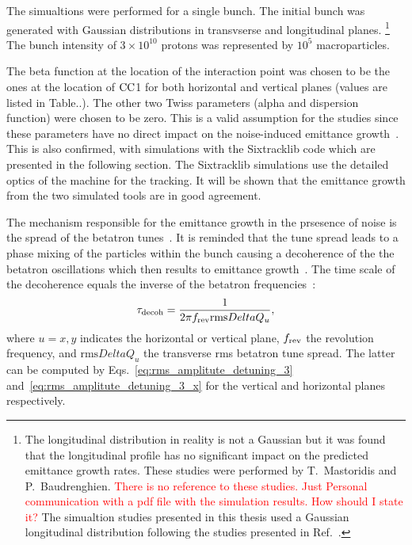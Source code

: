 The simualtions were performed for a single bunch. The initial bunch was generated with Gaussian distributions in transvserse and longitudinal planes. \footnote{The longitudinal distribution in reality is not a Gaussian but it was found that the longitudinal profile has no significant impact on the predicted emittance growth rates. These studies were performed by T.~Mastoridis and P.~Baudrenghien. \textcolor{red}{There is no reference to these studies. Just Personal communication with a pdf file with the simulation results. How should I state it?} The simualtion studies presented in this thesis used a Gaussian longitudinal distribution following the studies presented in Ref.~\cite{PhysRevSTAB.18.101001}.} 
The bunch intensity of $3\times 10^{10}$ protons was represented by $10^5$ macroparticles. 

The beta function at the location of the interaction point was chosen to be the ones at the location of ${\mathrm{CC}}$1 for both horizontal and vertical planes (values are listed in Table..). The other two Twiss parameters (alpha and dispersion function) were chosen to be zero. This is a valid assumption for the studies since these parameters have no direct impact on the noise-induced emittance growth~\cite{PhysRevSTAB.18.101001}. %
This is also confirmed, with simulations with the Sixtracklib code which are presented in the following section. The Sixtracklib simulations use the detailed optics of the machine for the tracking. It will be shown that the emittance growth from the two simulated tools are in good agreement.

The mechanism responsible for the emittance growth in the prsesence of noise is the spread of the betatron tunes~\cite{Lebedev:248620}. It is reminded that the tune spread leads to a phase mixing of the particles within the bunch causing a decoherence of the the betatron oscillations which then results to emittance growth~\cite{Lebedev:248620}. The time scale of the decoherence equals the inverse of the betatron frequencies~\cite{Lebedev:248620}: %
\begin{equation}\label{eq:decoherence_time}
    \tau_\mathrm{decoh} = \frac{1}{2\pi {f_\mathrm{rev}} \mathrm{rms}Delta Q_u},
\end{equation}
where $u={x,y}$ indicates the horizontal or vertical plane, ${f_\mathrm{rev}}$ the revolution frequency, and $\mathrm{rms}Delta Q_u$ the transverse rms betatron tune spread. The latter can be computed by Eqs.~\eqref{eq:rms_amplitute_detuning_3} and~\eqref{eq:rms_amplitute_detuning_3_x} for the vertical and horizontal planes respectively.


